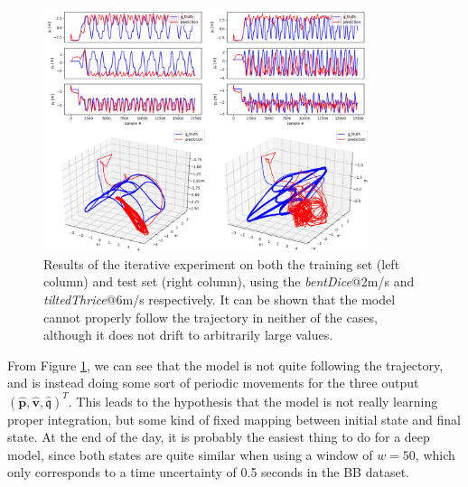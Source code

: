 \begin{figure}[h]
   \centering
   \includegraphics[width=0.85\textwidth]{thesis_template/img/iterative_bentDice_vs_tiltedThrice.jpg}
   \caption{Results of the iterative experiment on both the training set (left column) and test set (right column), using the \emph{bentDice}@2m/s and \emph{tiltedThrice}@6m/s respectively. It can be shown that the model cannot properly follow the trajectory in neither of the cases, although it does not drift to arbitrarily large values.}
   \label{fig:imu_so3_iterative_bentDice_vs_tiltedThrice_pos}
\end{figure}

From Figure \ref{fig:imu_so3_iterative_bentDice_vs_tiltedThrice_pos}, we can see that the model is not quite following the trajectory, and is instead doing some sort of periodic movements for the three output $(\mathbf{\hat{p}}, \mathbf{\hat{v}}, \mathfrak{\hat{q}})^T$. 
This leads to the hypothesis that the model is not really learning proper integration, but some kind of fixed mapping between initial state and final state.
At the end of the day, it is probably the easiest thing to do for a deep model, since both states are quite similar when using a window of $w=50$, which only corresponds to a time uncertainty of 0.5 seconds in the BB dataset. 

